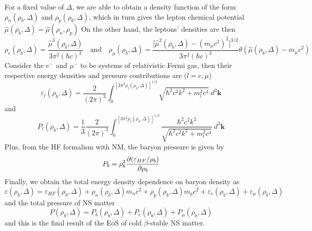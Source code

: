 For a fixed value of $\Delta$, we are able to obtain a density function of the form $\rho_n (\rho_b, \Delta)$ and $\rho_p (\rho_b, \Delta)$, which in turn gives the lepton chemical potential $\hat{\mu}(\rho_b,\Delta) = \hat{\mu}(\rho_n,\rho_p)$ On the other hand, the leptons' densities are then
\begin{equation}
        \rho_e(\rho_b,\Delta) = \frac{ \hat{\mu}^3(\rho_b,\Delta)}{ 3\pi^2 (\hbar c)^3} \quad\text{and}\quad \rho_\mu(\rho_b,\Delta) = \frac{ \Big[\hat{\mu}^2(\rho_b,\Delta) - (m_\mu c^2)^2\Big]^{3/2}}{ 3\pi^2 (\hbar c)^3} \theta(\hat{\mu}(\rho_b,\Delta)-m_\mu c^2)
\end{equation} 
Consider the $e^-$ and $\mu^-$ to be systems of relativistic Fermi gas, then their respective energy densities and pressure contributions are ($l=e,\mu$)
\begin{equation}
        \varepsilon_l(\rho_b,\Delta) = \frac{ 2}{ (2\pi)^3} \int_{{0}}^{{[3\pi^2\rho_l(\rho_b,\Delta)]^{1/3}}} {\sqrt{\hbar^2 c^2 k^2 + m_l^2 c^4}} \: d^3{\mathbf{k}}
\end{equation} 
and
\begin{equation}
        P_l(\rho_b,\Delta) = \frac{ 1}{ 3} \frac{ 2}{ (2\pi)^3} \int_{{0}}^{{[3\pi^2 \rho_l(\rho_b,\Delta)]^{1/3}}} { \frac{ \hbar^2 c^2 k^2}{ \sqrt{\hbar^2 c^2 k^2 + m_l^2 c^4}} } \: d^3{\mathbf{k}}
\end{equation} 
Plus, from the \gls{HF} formalism with \gls{NM}, the baryon pressure is given by
\begin{equation}
        P_b = \rho_b^2 \pdv{(\varepsilon_{HF}/\rho_b)}{\rho_b}
\end{equation}
Finally, we obtain the total energy density dependence on baryon density as 
\begin{equation}
        \varepsilon(\rho_b,\Delta) = \varepsilon_{HF}(\rho_b,\Delta) + \rho_n(\rho_b,\Delta)m_n c^2 + \rho_p(\rho_b,\Delta)m_p c^2 + \varepsilon_e(\rho_b,\Delta) + \varepsilon_\mu(\rho_b,\Delta)
\end{equation}
and the total pressure of \gls{NS} matter
\begin{equation}
        P(\rho_b,\Delta) = P_b(\rho_b,\Delta) + P_e(\rho_b,\Delta) + P_\mu(\rho_b,\Delta)
\end{equation}
and this is the final result of the \gls{EoS} of cold $\beta$-stable \gls{NS} matter.
